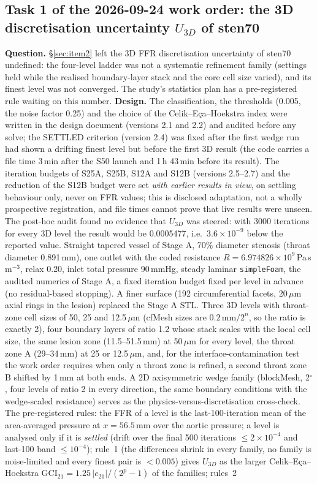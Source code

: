 \documentclass[11pt]{article}
\begin{document}
\subsection{Task 1 of the 2026-09-24 work order: the 3D discretisation uncertainty $U_{3D}$ of sten70}
\label{sec:u3d}
\textbf{Question.} \S\ref{sec:item2} left the 3D FFR discretisation uncertainty of sten70 undefined: the four-level ladder was not a systematic refinement family (settings held while the realised boundary-layer stack and the core cell size varied), and its finest level was not converged. The study's statistics plan has a pre-registered rule waiting on this number. \textbf{Design.} The classification, the thresholds (0.005, the noise factor 0.25) and the choice of the Celik--Eça--Hoekstra index were written in the design document (versions 2.1 and 2.2) and audited before any solve; the SETTLED criterion (version 2.4) was fixed after the first wedge run had shown a drifting finest level but before the first 3D result (the code carries a file time 3\,min after the S50 launch and 1\,h 43\,min before its result). The iteration budgets of S25A, S25B, S12A and S12B (versions 2.5--2.7) and the reduction of the S12B budget were set \emph{with earlier results in view}, on settling behaviour only, never on FFR values; this is disclosed adaptation, not a wholly prospective registration, and file times cannot prove that live results were unseen. The post-hoc audit found no evidence that $U_{3D}$ was steered: with 3000 iterations for every 3D level the result would be 0.0005477, i.e.\ $3.6\times10^{-9}$ below the reported value. Straight tapered vessel of Stage A, 70\% diameter stenosis (throat diameter 0.891\,mm), one outlet with the coded resistance $R=6.974826\times10^9$\,Pa\,s\,m$^{-3}$, relax 0.20, inlet total pressure 90\,mmHg, steady laminar \texttt{simpleFoam}, the audited numerics of Stage A, a fixed iteration budget fixed per level in advance (no residual-based stopping). A finer surface (192 circumferential facets, 20\,$\mu$m axial rings in the lesion) replaced the Stage A STL. Three 3D levels with throat-zone cell sizes of 50, 25 and 12.5\,$\mu$m (cfMesh sizes are $0.2\,\text{mm}/2^n$, so the ratio is exactly 2), four boundary layers of ratio 1.2 whose stack scales with the local cell size, the same lesion zone (11.5--51.5\,mm) at 50\,$\mu$m for every level, the throat zone A (29--34\,mm) at 25 or 12.5\,$\mu$m, and, for the interface-contamination test the work order requires when only a throat zone is refined, a second throat zone B shifted by 1\,mm at both ends. A 2D axisymmetric wedge family (blockMesh, 2$^\circ$, four levels of ratio 2 in every direction, the same boundary conditions with the wedge-scaled resistance) serves as the physics-versus-discretisation cross-check. The pre-registered rules: the FFR of a level is the last-100-iteration mean of the area-averaged pressure at $x=56.5$\,mm over the aortic pressure; a level is analysed only if it is \emph{settled} (drift over the final 500 iterations $\leq2\times10^{-4}$ and last-100 band $\leq10^{-4}$); rule~1 (the differences shrink in every family, no family is noise-limited and every finest pair is $<0.005$) gives $U_{3D}$ as the larger Celik--Eça--Hoekstra GCI$_{21}=1.25\,|e_{21}|/(2^p-1)$ of the families; rules~2 
\end{document}
